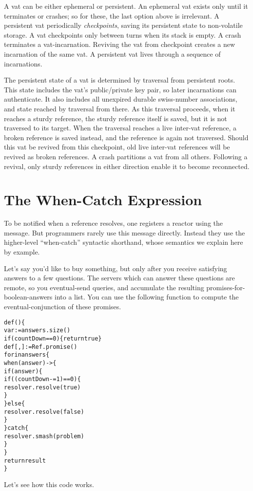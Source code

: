 \documentclass{llncs}
\begin{document}
A vat can be either ephemeral or persistent. An ephemeral vat exists
only until it terminates or crashes; so for these, the last option
above is irrelevant. A persistent vat periodically \emph{checkpoints},
saving its persistent state to non-volatile storage. A vat checkpoints
only between turns when its stack is empty. A crash terminates a
vat-incarnation. Reviving the vat from checkpoint creates a new
incarnation of the same vat. A persistent vat lives through a sequence
of incarnations.

The persistent state of a vat is determined by traversal from
persistent roots. This state includes the vat's public/private key
pair, so later incarnations can authenticate. It also includes all
unexpired durable swiss-number associations, and state reached by
traversal from there. As this traversal proceeds, when it reaches a
sturdy reference, the sturdy reference itself is saved, but it is not
traversed to its target. When the traversal reaches a live inter-vat
reference, a broken reference is saved instead, and the reference is
again not traversed. Should this vat be revived from this checkpoint,
old live inter-vat references will be revived as broken references. A
crash partitions a vat from all others. Following a revival, only
sturdy references in either direction enable it to become reconnected.

\section{The When-Catch Expression}

To be notified when a reference resolves, one registers a reactor
using the  message. But programmers rarely
use this message directly. Instead they use the higher-level
``when-catch'' syntactic shorthand, whose semantics we explain here by
example.

Let's say you'd like to buy something, but only after you receive
satisfying answers to a few questions. The servers which can answer
these questions are remote, so you eventual-send queries, and
accumulate the resulting promises-for-boolean-answers into a list. You
can use the following  function to compute the
eventual-conjunction of these promises.
%
\begin{alltt}
    def () \{
        var  := answers.size()
        if (countDown == 0) \{ return true \}
        def [, ] := Ref.promise()
        for  in answers \{
            when (answer) -> \{
                if (answer) \{
                    if ((countDown -= 1) == 0) \{
                        resolver.resolve(true) 
                    \}
                \} else \{
                    resolver.resolve(false)
                \}
            \} catch  \{
                resolver.smash(problem)
            \}
        \}
        return result
    \}
\end{alltt}
%
Let's see how this code works.
\end{document}
